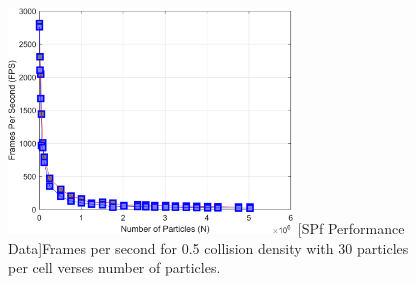 \begin{figure}[h]
\centering
\includegraphics[width=2.97in]{../plots/Perf_VCUBE011.png}
[SPf Performance Data]{Frames per second for 0.5 collision density with 30 particles per cell verses number of particles.}
\label{fig:Perf_VCUBE01}
\end{figure}
